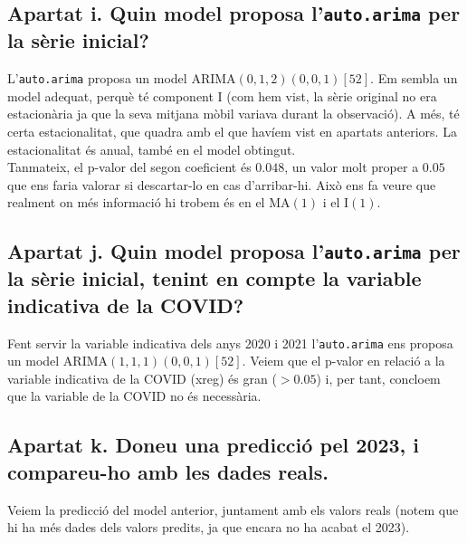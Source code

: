 \documentclass[a4paper, 11pt]{article}
\begin{document}
\subsection*{Apartat i. Quin model proposa l'\texttt{auto.arima} per la sèrie inicial?}

L'\texttt{auto.arima} proposa un model ARIMA$(0, 1, 2)(0, 0, 1)[52]$. Em sembla un model adequat, perquè té component I
(com hem vist, la sèrie original no era estacionària ja que la seva mitjana mòbil variava durant la observació). A més,
té certa estacionalitat, que quadra amb el que havíem vist en apartats anteriors. La estacionalitat és anual, també en
el model obtingut.\\
Tanmateix, el p-valor del segon coeficient és $0.048$, un valor molt proper a $0.05$ que ens faria valorar si
descartar-lo en cas d'arribar-hi. Això ens fa veure que realment on més informació hi trobem és en el MA$(1)$ i el
I$(1)$.

\subsection*{Apartat j. Quin model proposa l'\texttt{auto.arima} per la sèrie inicial, tenint en compte la variable indicativa de la COVID?}

Fent servir la variable indicativa dels anys 2020 i 2021 l'\texttt{auto.arima} ens proposa un model ARIMA$(1, 1, 1)(0,
  0, 1)[52]$. Veiem que el p-valor en relació a la variable indicativa de la COVID (xreg) és gran ($> 0.05$) i, per tant,
concloem que la variable de la COVID no és necessària.

\subsection*{Apartat k. Doneu una predicció pel 2023, i compareu-ho amb les dades reals.}

Veiem la predicció del model anterior, juntament amb els valors reals (notem que hi ha més dades dels valors predits,
ja que encara no ha acabat el 2023).
\end{document}
